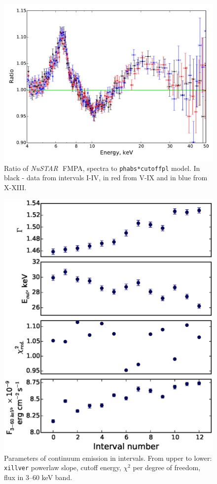 \documentclass[a4paper,fleqn,usenatbib]{mnras}
\def\nustar{{\em NuSTAR\,}}
\begin{document}
 \begin{figure}
\centerline{\includegraphics[width=\linewidth]{ratios_v01.pdf}}
\caption{Ratio of \nustar\, FMPA, spectra to \texttt{phabs*cutoffpl} model. In black - data from intervals I-IV, in red from V-IX and in blue from X-XIII.} 
\label{fig:ratios}
\end{figure}  

\begin{figure}
\centerline{\includegraphics[width=\linewidth]{intspe_v01.eps}}
\caption{Parameters of continuum emission in intervals. From upper to lower: \texttt{xillver} powerlaw slope, cutoff energy, $\chi^{2}$ per degree of freedom, flux in 3--60 keV band.} 
\label{fig:intspe}
\end{figure}  
            
\end{document}
